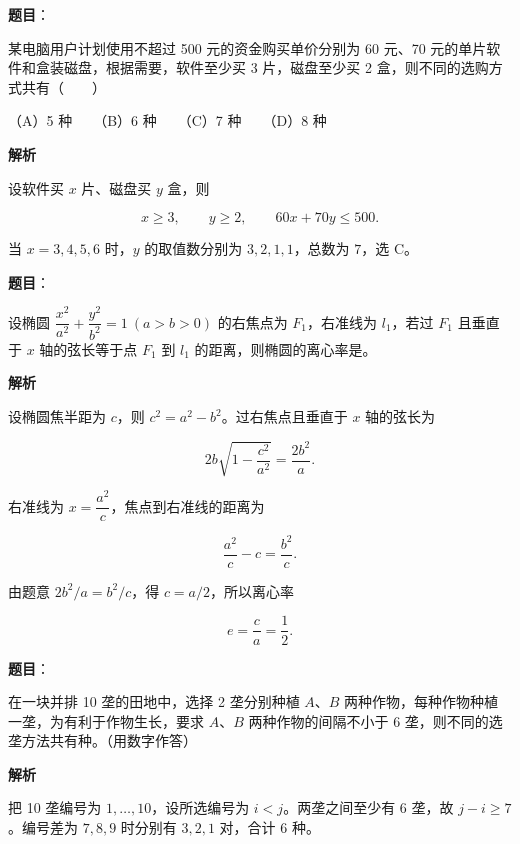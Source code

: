 \begin{answer}

\textbf{题目}：

某电脑用户计划使用不超过 500 元的资金购买单价分别为 60 元、70 元的单片软件和盒装磁盘，根据需要，软件至少买 3 片，磁盘至少买 2 盒，则不同的选购方式共有\mbox{（　　）}

（A）5 种　　（B）6 种　　（C）7 种　　（D）8 种

\textbf{解析}

设软件买 $x$ 片、磁盘买 $y$ 盒，则

\nopagebreak[4]
\[
x\ge3,\qquad y\ge2,\qquad60x+70y\le500.
\]

当 $x=3,4,5,6$ 时，$y$ 的取值数分别为 $3,2,1,1$，总数为 $7$，选 C。


\end{answer}
\begin{answer}

\textbf{题目}：

设椭圆 $\dfrac{x^2}{a^2}+\dfrac{y^2}{b^2}=1\ (a>b>0)$ 的右焦点为 $F_1$，右准线为 $l_1$，若过 $F_1$ 且垂直于 $x$ 轴的弦长等于点 $F_1$ 到 $l_1$ 的距离，则椭圆的离心率是\gkblank{}。

\textbf{解析}

设椭圆焦半距为 $c$，则 $c^2=a^2-b^2$。过右焦点且垂直于 $x$ 轴的弦长为

\nopagebreak[4]
\[
2b\sqrt{1-\frac{c^2}{a^2}}=\frac{2b^2}{a}.
\]

右准线为 $x=\dfrac{a^2}{c}$，焦点到右准线的距离为

\nopagebreak[4]
\[
\frac{a^2}{c}-c=\frac{b^2}{c}.
\]

由题意 $2b^2/a=b^2/c$，得 $c=a/2$，所以离心率

\nopagebreak[4]
\[
e=\frac ca=\frac12.
\]


\end{answer}
\begin{answer}

\textbf{题目}：

在一块并排 10 垄的田地中，选择 2 垄分别种植 $A$、$B$ 两种作物，每种作物种植一垄，为有利于作物生长，要求 $A$、$B$ 两种作物的间隔不小于 6 垄，则不同的选垄方法共有\gkblank{}种。（用数字作答）

\textbf{解析}

把 10 垄编号为 $1,\ldots,10$，设所选编号为 $i<j$。两垄之间至少有 6 垄，故 $j-i\ge7$。编号差为 $7,8,9$ 时分别有 $3,2,1$ 对，合计 $6$ 种。


\end{answer}
